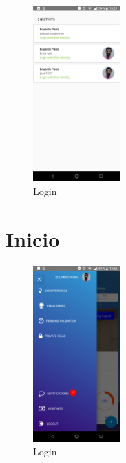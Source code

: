 \begin{figure}[!h]
	\begin{center}
		\includegraphics[width=0.3\textwidth]{./img/anexo1/seleccion_empresa.png}
		\caption{Login}
		\label{fig:seleccion_empresa}
	\end{center}
\end{figure}

\section{Inicio}

\begin{figure}[!h]
	\begin{center}
		\includegraphics[width=0.3\textwidth]{./img/anexo1/menu_admin.png}
		\caption{Login}
		\label{fig:menu_admin}
	\end{center}
\end{figure}

